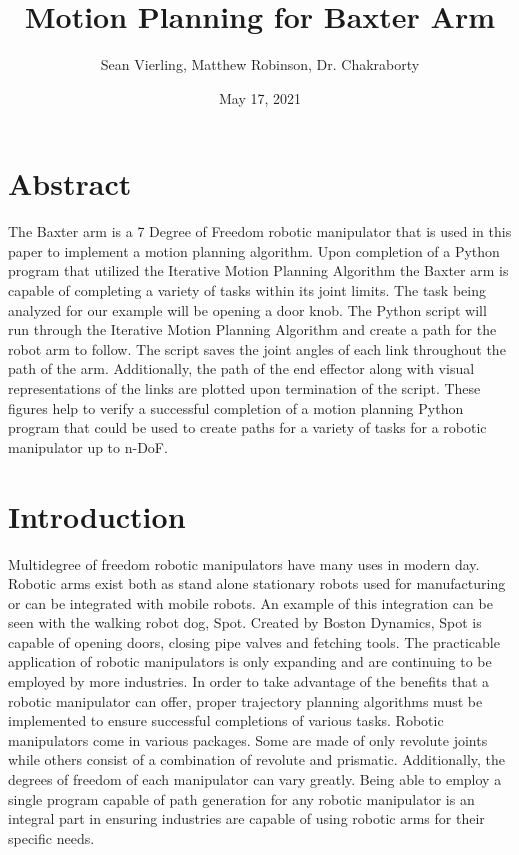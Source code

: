 \documentclass[11pt]{article}
\title{ Motion Planning for Baxter Arm }
\author{Sean Vierling, Matthew Robinson, Dr. Chakraborty }
\date{May 17,  2021}
\begin{document}
\maketitle

\section*{Abstract}
The Baxter arm is a 7 Degree of Freedom robotic manipulator that is used in this paper to implement a motion planning algorithm. Upon completion of a Python program that utilized the Iterative Motion Planning Algorithm the Baxter arm is capable of completing a variety of tasks within its joint limits. The task being analyzed for our example will be opening a door knob. The Python script will run through the Iterative Motion Planning Algorithm and create a path for the robot arm to follow. The script saves the joint angles of each link throughout the path of the arm. Additionally, the path of the end effector along with visual representations of the links are plotted upon termination of the script. These figures help to verify a successful completion of a motion planning Python program that could be used to create paths for a variety of tasks for a robotic manipulator up to n-DoF. 

\newpage
\section{Introduction}
Multidegree of freedom robotic manipulators have many uses in modern day. Robotic arms exist both as stand alone stationary robots used for manufacturing or can be integrated with mobile robots. An example of this integration can be seen with the walking robot dog, Spot.  Created by Boston Dynamics, Spot is capable of opening doors, closing pipe valves and fetching tools. The practicable application of robotic manipulators is only expanding and are continuing to be employed by more industries. In order to take advantage of the benefits that a robotic manipulator can offer, proper trajectory planning algorithms must be implemented to ensure successful completions of various tasks. Robotic manipulators come in various packages. Some are made of only revolute joints while others consist of a combination of revolute and prismatic. Additionally, the degrees of freedom of each manipulator can vary greatly. Being able to employ a single program capable of path generation for any robotic manipulator is an integral part in ensuring industries are capable of using robotic arms for their specific needs.  
\end{document}
